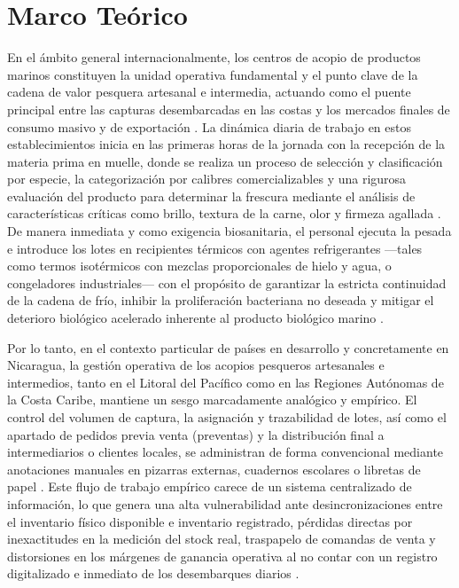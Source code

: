 
\section{Marco Teórico}

En el ámbito general internacionalmente, los centros de acopio de productos marinos constituyen la unidad operativa fundamental y el punto clave de la cadena de valor pesquera artesanal e intermedia, actuando como el puente principal entre las capturas desembarcadas en las costas y los mercados finales de consumo masivo y de exportación \parencite{fao2020,ifad2020,salas2011}. La dinámica diaria de trabajo en estos establecimientos inicia en las primeras horas de la jornada con la recepción de la materia prima en muelle, donde se realiza un proceso de selección y clasificación por especie, la categorización por calibres comercializables y una rigurosa evaluación del producto para determinar la frescura mediante el análisis de características críticas como brillo, textura de la carne, olor y firmeza agallada \parencite{garcia2021,sumaila2020}. De manera inmediata y como exigencia biosanitaria, el personal ejecuta la pesada e introduce los lotes en recipientes térmicos con agentes refrigerantes ---tales como termos isotérmicos con mezclas proporcionales de hielo y agua, o congeladores industriales--- con el propósito de garantizar la estricta continuidad de la cadena de frío, inhibir la proliferación bacteriana no deseada y mitigar el deterioro biológico acelerado inherente al producto biológico marino \parencite{fedepesca2020,shaw2019}.

Por lo tanto, en el contexto particular de países en desarrollo y concretamente en Nicaragua, la gestión operativa de los acopios pesqueros artesanales e intermedios, tanto en el Litoral del Pacífico como en las Regiones Autónomas de la Costa Caribe, mantiene un sesgo marcadamente analógico y empírico. El control del volumen de captura, la asignación y trazabilidad de lotes, así como el apartado de pedidos previa venta (preventas) y la distribución final a intermediarios o clientes locales, se administran de forma convencional mediante anotaciones manuales en pizarras externas, cuadernos escolares o libretas de papel \parencite{garcia2021,ifad2020,inpesca2022}. Este flujo de trabajo empírico carece de un sistema centralizado de información, lo que genera una alta vulnerabilidad ante desincronizaciones entre el inventario físico disponible e inventario registrado, pérdidas directas por inexactitudes en la medición del stock real, traspapelo de comandas de venta y distorsiones en los márgenes de ganancia operativa al no contar con un registro digitalizado e inmediato de los desembarques diarios \parencite{fao2020,sumaila2020}.

